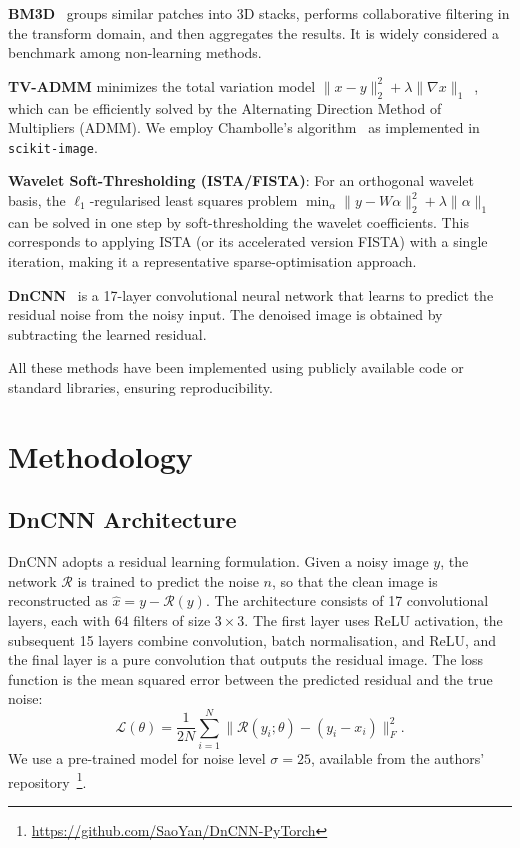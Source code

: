 \documentclass[twocolumn]{article}
\begin{document}
\textbf{BM3D}~\cite{dabov2007image} groups similar patches into 3D stacks, performs collaborative filtering in the transform domain, and then aggregates the results. It is widely considered a benchmark among non-learning methods.

\textbf{TV-ADMM} minimizes the total variation model $\|x-y\|_2^2 + \lambda \|\nabla x\|_1$~\cite{rudin1992nonlinear}, which can be efficiently solved by the Alternating Direction Method of Multipliers (ADMM). We employ Chambolle's algorithm~\cite{chambolle2004algorithm} as implemented in \texttt{scikit-image}.

\textbf{Wavelet Soft-Thresholding (ISTA/FISTA)}: For an orthogonal wavelet basis, the $\ell_1$-regularised least squares problem $\min_\alpha \|y - W\alpha\|_2^2 + \lambda \|\alpha\|_1$ can be solved in one step by soft-thresholding the wavelet coefficients. This corresponds to applying ISTA (or its accelerated version FISTA) with a single iteration, making it a representative sparse-optimisation approach.

\textbf{DnCNN}~\cite{zhang2017beyond} is a 17-layer convolutional neural network that learns to predict the residual noise from the noisy input. The denoised image is obtained by subtracting the learned residual.

All these methods have been implemented using publicly available code or standard libraries, ensuring reproducibility.

\section{Methodology}
\subsection{DnCNN Architecture}
DnCNN adopts a residual learning formulation. Given a noisy image $y$, the network $\mathcal{R}$ is trained to predict the noise $n$, so that the clean image is reconstructed as $\hat{x} = y - \mathcal{R}(y)$. The architecture consists of 17 convolutional layers, each with 64 filters of size $3\times3$. The first layer uses ReLU activation, the subsequent 15 layers combine convolution, batch normalisation, and ReLU, and the final layer is a pure convolution that outputs the residual image. The loss function is the mean squared error between the predicted residual and the true noise:
\begin{equation}
\mathcal{L}(\theta) = \frac{1}{2N}\sum_{i=1}^N \|\mathcal{R}(y_i;\theta) - (y_i - x_i)\|_F^2.
\end{equation}
We use a pre-trained model for noise level $\sigma=25$, available from the authors' repository~\footnote{\url{https://github.com/SaoYan/DnCNN-PyTorch}}.
\end{document}
